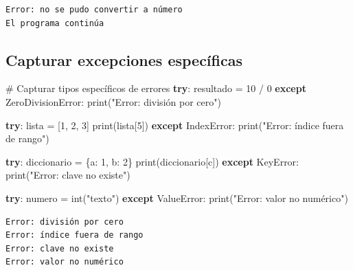 \documentclass[
  doc,
  floatsintext,
  longtable,
  a4paper,
  nolmodern,
  notxfonts,
  notimes,
  12pt,
  colorlinks=true,linkcolor=blue,citecolor=blue,urlcolor=blue]{apa7}
\newenvironment{Shaded}{\begin{snugshade}}{\end{snugshade}}
\newcommand{\BuiltInTok}[1]{\textcolor[rgb]{0.00,0.23,0.31}{#1}}
\newcommand{\CommentTok}[1]{\textcolor[rgb]{0.37,0.37,0.37}{#1}}
\newcommand{\ControlFlowTok}[1]{\textcolor[rgb]{0.00,0.23,0.31}{\textbf{#1}}}
\newcommand{\DecValTok}[1]{\textcolor[rgb]{0.68,0.00,0.00}{#1}}
\newcommand{\NormalTok}[1]{\textcolor[rgb]{0.00,0.23,0.31}{#1}}
\newcommand{\OperatorTok}[1]{\textcolor[rgb]{0.37,0.37,0.37}{#1}}
\newcommand{\PreprocessorTok}[1]{\textcolor[rgb]{0.68,0.00,0.00}{#1}}
\newcommand{\StringTok}[1]{\textcolor[rgb]{0.13,0.47,0.30}{#1}}
\begin{document}
\begin{verbatim}
Error: no se pudo convertir a número
El programa continúa
\end{verbatim}

\subsection{Capturar excepciones
específicas}\label{capturar-excepciones-especuxedficas}

\begin{Shaded}
\begin{Highlighting}[]
\CommentTok{\# Capturar tipos específicos de errores}
\ControlFlowTok{try}\NormalTok{:}
\NormalTok{    resultado }\OperatorTok{=} \DecValTok{10} \OperatorTok{/} \DecValTok{0}
\ControlFlowTok{except} \PreprocessorTok{ZeroDivisionError}\NormalTok{:}
    \BuiltInTok{print}\NormalTok{(}\StringTok{"Error: división por cero"}\NormalTok{)}

\ControlFlowTok{try}\NormalTok{:}
\NormalTok{    lista }\OperatorTok{=}\NormalTok{ [}\DecValTok{1}\NormalTok{, }\DecValTok{2}\NormalTok{, }\DecValTok{3}\NormalTok{]}
    \BuiltInTok{print}\NormalTok{(lista[}\DecValTok{5}\NormalTok{])}
\ControlFlowTok{except} \PreprocessorTok{IndexError}\NormalTok{:}
    \BuiltInTok{print}\NormalTok{(}\StringTok{"Error: índice fuera de rango"}\NormalTok{)}

\ControlFlowTok{try}\NormalTok{:}
\NormalTok{    diccionario }\OperatorTok{=}\NormalTok{ \{}\StringTok{\textquotesingle{}a\textquotesingle{}}\NormalTok{: }\DecValTok{1}\NormalTok{, }\StringTok{\textquotesingle{}b\textquotesingle{}}\NormalTok{: }\DecValTok{2}\NormalTok{\}}
    \BuiltInTok{print}\NormalTok{(diccionario[}\StringTok{\textquotesingle{}c\textquotesingle{}}\NormalTok{])}
\ControlFlowTok{except} \PreprocessorTok{KeyError}\NormalTok{:}
    \BuiltInTok{print}\NormalTok{(}\StringTok{"Error: clave no existe"}\NormalTok{)}

\ControlFlowTok{try}\NormalTok{:}
\NormalTok{    numero }\OperatorTok{=} \BuiltInTok{int}\NormalTok{(}\StringTok{"texto"}\NormalTok{)}
\ControlFlowTok{except} \PreprocessorTok{ValueError}\NormalTok{:}
    \BuiltInTok{print}\NormalTok{(}\StringTok{"Error: valor no numérico"}\NormalTok{)}
\end{Highlighting}
\end{Shaded}

\begin{verbatim}
Error: división por cero
Error: índice fuera de rango
Error: clave no existe
Error: valor no numérico
\end{verbatim}
\end{document}
